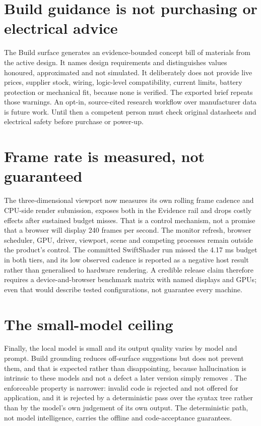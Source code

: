 \documentclass[11pt,a4paper]{report}
\begin{document}
\section{Build guidance is not purchasing or electrical advice}
The Build surface generates an evidence-bounded concept bill of materials from the active design. It names design requirements and distinguishes values honoured, approximated and not simulated. It deliberately does not provide live prices, supplier stock, wiring, logic-level compatibility, current limits, battery protection or mechanical fit, because none is verified. The exported brief repeats those warnings. An opt-in, source-cited research workflow over manufacturer data is future work. Until then a competent person must check original datasheets and electrical safety before purchase or power-up.

\section{Frame rate is measured, not guaranteed}
\label{sec:framerate}
The three-dimensional viewport now measures its own rolling frame cadence and CPU-side render submission, exposes both in the Evidence rail and drops costly effects after sustained budget misses. That is a control mechanism, not a promise that a browser will display 240 frames per second. The monitor refresh, browser scheduler, GPU, driver, viewport, scene and competing processes remain outside the product's control. The committed SwiftShader run missed the 4.17 ms budget in both tiers, and its low observed cadence is reported as a negative host result rather than generalised to hardware rendering. A credible release claim therefore requires a device-and-browser benchmark matrix with named displays and GPUs; even that would describe tested configurations, not guarantee every machine.

\section{The small-model ceiling}
Finally, the local model is small and its output quality varies by model and prompt. Build grounding reduces off-surface suggestions but does not prevent them, and that is expected rather than disappointing, because hallucination is intrinsic to these models and not a defect a later version simply removes \citep{huang2025}. The enforceable property is narrower: invalid code is rejected and not offered for application, and it is rejected by a deterministic pass over the syntax tree \citep{khati2026} rather than by the model's own judgement of its own output. The deterministic path, not model intelligence, carries the offline and code-acceptance guarantees.
\end{document}
